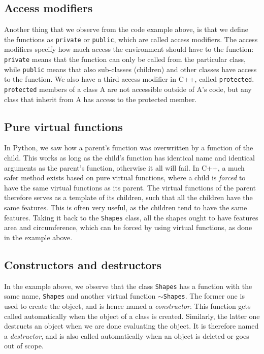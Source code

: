 \subsection{Access modifiers}
Another thing that we observe from the code example above, is that we define the functions as \texttt{private} or \texttt{public}, which are called access modifiers. The access modifiers specify how much access the environment should have to the function: \texttt{private} means that the function can only be called from the particular class, while \texttt{public} means that also sub-classes (children) and other classes have access to the function. We also have a third access modifier in C++, called \texttt{protected}. \texttt{protected} members of a class A are not accessible outside of A's code, but any class that inherit from A has access to the protected member. 

\subsection{Pure virtual functions}
In Python, we saw how a parent's function was overwritten by a function of the child. This works as long as the child's function has identical name and identical arguments as the parent's function, otherwise it all will fail. In C++, a much safer method exists based on pure virtual functions, where a child is \textit{forced} to have the same virtual functions as its parent. The virtual functions of the parent therefore serves as a template of its children, such that all the children have the same features. This is often very useful, as the children tend to have the same features. Taking it back to the \texttt{Shapes} class, all the shapes ought to have features area and circumference, which can be forced by using virtual functions, as done in the example above. 

\subsection{Constructors and destructors}
In the example above, we observe that the class \texttt{Shapes} has a function with the same name, \texttt{Shapes} and another virtual function $\sim$\texttt{Shapes}. The former one is used to create the object, and is hence named a \textit{constructor}. This function gets called automatically when the object of a class is created. Similarly, the latter one destructs an object when we are done evaluating the object. It is therefore named a \textit{destructor}, and is also called automatically when an object is deleted or goes out of scope.

